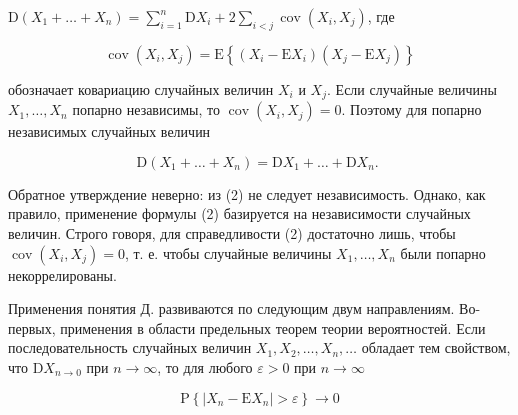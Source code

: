 \documentclass[10pt]{article}
\begin{document}
$\mathrm{D}\left(X_{1}+\ldots+X_{n}\right)=\sum_{i=1}^{n} \mathrm{D} X_{i}+2 \sum_{i<j} \operatorname{cov}\left(X_{i}, X_{j}\right)$, где



\[

\operatorname{cov}\left(X_{i}, X_{j}\right)=\mathrm{E}\left\{\left(X_{i}-\mathrm{E} X_{i}\right)\left(X_{j}-\mathrm{E} X_{j}\right)\right\}

\]



обозначает ковариацию случайных величин $X_{i}$ и $X_{j}$. Если случайные величины $X_{1}, \ldots, X_{n}$ попарно независимы, то $\operatorname{cov}\left(X_{i}, X_{j}\right)=0$. Поэтому для попарно независимых случайных величин



\[

\mathrm{D}\left(X_{1}+\ldots+X_{n}\right)=\mathrm{D} X_{1}+\ldots+\mathrm{D} X_{n} \text {. }

\]



Обратное утверждение неверно: из (2) не следует независимость. Однако, как правило, применение формулы (2) базируется на независимости случайных величин. Строго говоря, для справедливости (2) достаточно лишь, чтобы $\operatorname{cov}\left(X_{i}, X_{j}\right)=0$, т. е. чтобы случайные величины $X_{1}, \ldots, X_{n}$ были попарно некоррелированы.



Применения понятия Д. развиваются по следующим двум направлениям. Во-первых, применения в области предельных теорем теории вероятностей. Если последовательность случайных величин $X_{1}, X_{2}, \ldots, X_{n}, \ldots$ обладает тем свойством, что $\mathrm{D} X_{n \rightarrow 0}$ при $n \rightarrow \infty$, то для любого $\varepsilon>0$ при $n \rightarrow \infty$



\[

\mathrm{P}\left\{\left|X_{n}-\mathrm{E} X_{n}\right|>\varepsilon\right\} \longrightarrow 0

\]
\end{document}
